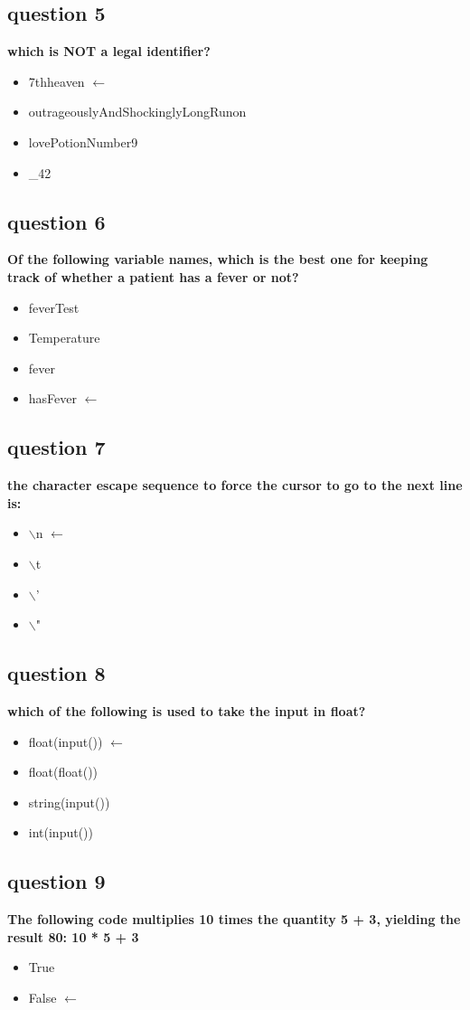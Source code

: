 \documentclass[10pt]{article}
\begin{document}
\subsection*{question 5}
\textbf{which is NOT a legal identifier?}
\begin{itemize}
\item 7thheaven $\leftarrow$
\item outrageouslyAndShockinglyLongRunon
\item lovePotionNumber9
\item \_42
\end{itemize}
\subsection*{question 6}
\textbf{Of the following variable names, which is the best one for keeping track of whether a patient has a fever or not?}
\begin{itemize}
\item feverTest
\item Temperature
\item fever
\item hasFever $\leftarrow$
\end{itemize}
\subsection*{question 7}
\textbf{the character escape sequence to force the cursor to go to the next line is:}
\begin{itemize}
\item $\backslash$n $\leftarrow$
\item $\backslash$t
\item $\backslash$'
\item $\backslash$"
\end{itemize}
\subsection*{question 8}
\textbf{which of the following is used to take the input in float?}
\begin{itemize}
\item float(input()) $\leftarrow$
\item float(float())
\item string(input())
\item int(input())
\end{itemize}
\subsection*{question 9}
\textbf{The following code multiplies 10 times the quantity 5 + 3, yielding the result 80: 10 * 5 + 3}
\begin{itemize}
\item True
\item False $\leftarrow$
\end{itemize}
\end{document}

